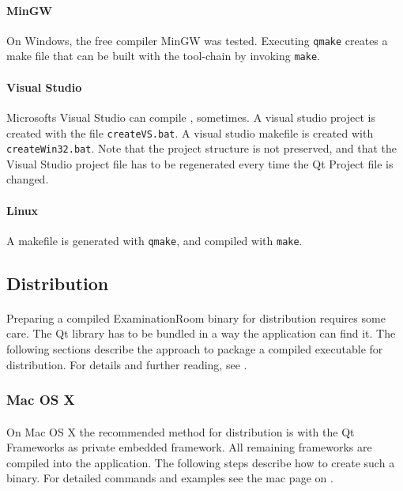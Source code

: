 \paragraph{MinGW}
On Windows, the free compiler MinGW was tested.
Executing \texttt{qmake} creates a make file that can be built with the tool-chain by invoking \texttt{make}.

\paragraph{Visual Studio}
Microsofts Visual Studio can compile \ER, sometimes.
A visual studio project is created with the file \texttt{createVS.bat}.
A visual studio makefile is created with \texttt{createWin32.bat}.
Note that the project structure is not preserved, and that the Visual Studio project file has to be regenerated every time the Qt Project file is changed.

\paragraph{Linux}
A makefile is generated with \texttt{qmake}, and compiled with \texttt{make}.


\subsection{Distribution}
\paragraph{}
Preparing a compiled ExaminationRoom binary for distribution requires some care.
The Qt library has to be bundled in a way the application can find it.
The following sections describe the approach to package a compiled executable for distribution.
For details and further reading, see \cite{deployment}.

\subsubsection{Mac OS X}
\paragraph{}
On Mac OS X the recommended method for distribution is with the Qt Frameworks as private embedded framework.
All remaining frameworks are compiled into the application.
The following steps describe how to create such a binary.
For detailed commands and examples see the mac page on \cite{deployment}.

